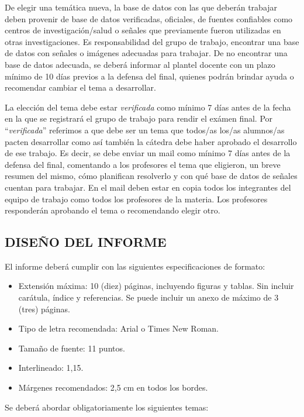 \documentclass[10pt]{article}
\begin{document}
De elegir una temática nueva, la base de datos con las que deberán trabajar deben provenir de base de datos verificadas, oficiales, de fuentes confiables como centros de investigación/salud o señales que previamente fueron utilizadas en otras investigaciones. Es responsabilidad del grupo de trabajo, encontrar una base de datos con señales o imágenes adecuadas para trabajar. De no encontrar una base de datos adecuada, se deberá informar al plantel docente con un plazo mínimo de 10 días previos a la defensa del final, quienes podrán brindar ayuda o recomendar cambiar el tema a desarrollar. 
\vspace{0.25cm}

La elección del tema debe estar \textit{verificada} como mínimo 7 días antes de la fecha en la que se registrará el grupo de trabajo para rendir el exámen final. Por “\textit{verificada}” referimos a que debe ser un tema que todos/as los/as alumnos/as pacten desarrollar como así también la cátedra debe haber aprobado el desarrollo de ese trabajo. Es decir, se debe enviar un mail como mínimo 7 días antes de la defensa del final, comentando a los profesores el tema que eligieron, un breve resumen del mismo, cómo planifican resolverlo y con qué base de datos de señales cuentan para trabajar. En el mail deben estar en copia todos los integrantes del equipo de trabajo como todos los profesores de la materia. Los profesores responderán aprobando el tema o recomendando elegir otro.

\subsection*{DISEÑO DEL INFORME}

El informe deberá cumplir con las siguientes especificaciones de formato:

\begin{itemize}
\item Extensión máxima: 10 (diez) páginas, incluyendo figuras y tablas. Sin incluir carátula, índice y referencias. Se puede incluir un anexo de máximo de 3 (tres) páginas.
\item Tipo de letra recomendada: Arial o Times New Roman.
\item Tamaño de fuente: 11 puntos.
\item Interlineado: 1,15.
\item Márgenes recomendados: 2,5 cm en todos los bordes.
\end{itemize}

Se deberá abordar obligatoriamente los siguientes temas:
\end{document}
